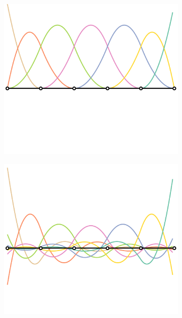 \documentclass{article}
\begin{document}
\begin{figure}
    \centering
    \begin{subfigure}[b]{0.32\linewidth}        %
        \centering
        \includegraphics[width=\linewidth]{basisfuntioncs}
        \caption{}
    \end{subfigure}
    \begin{subfigure}[b]{0.32\linewidth}        %
        \centering
        \includegraphics[width=\linewidth]{dualGlobal}

\end{subfigure}
\end{figure}
\end{document}
